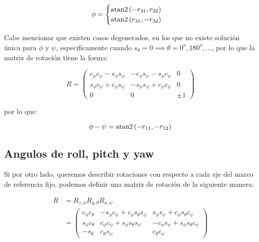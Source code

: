 \begin{multicols*}{3}
            \begin{equation}
                \phi =
                \begin{cases}
                    \operatorname{atan2}{(-r_{31}, r_{32})} \\
                    \operatorname{atan2}{(r_{31}, -r_{32})}
                \end{cases}
            \end{equation}

            Cabe mencionar que existen casos degenerados, en los que no existe solución única para $\phi$ y $\psi$, especificamente cuando $s_{\theta} = 0 \implies \theta = 0^o, 180^o, \dots$, por lo que la matriz de rotación tiene la forma:

            \begin{equation*}
                R =
                \begin{pmatrix}
                    c_{\phi} c_{\psi} - s_{\phi} s_{\psi} & - c_{\phi} s_{\psi} - s_{\phi} c_{\psi} & 0 \\
                    s_{\phi} c_{\psi} + c_{\phi} s_{\psi} & - s_{\phi} s_{\psi} + c_{\phi} c_{\psi} & 0 \\
                    0 & 0 & \pm 1
                \end{pmatrix}
            \end{equation*}

            por lo que:

            \begin{equation}
                \phi - \psi = \operatorname{atan2}{(-r_{11}, -r_{12})}
            \end{equation}


        \subsection{Angulos de roll, pitch y yaw}

            Si por otro lado, queremos describir rotaciones con respecto a cada eje del marco de referencia fijo, podemos definir una matriz de rotación de la siguiente manera:

            \begin{align}
                R &= R_{z, \phi} R_{y, \theta} R_{x, \psi} \nonumber \\
                &=
                \begin{pmatrix}
                    c_{\phi} c_{\theta} & -s_{\phi} c_{\psi} + c_{\phi} s_{\theta} s_{\psi} & s_{\phi} s_{\psi} + c_{\phi} s_{\theta} c_{\psi} \\
                    s_{\phi} c_{\theta} & c_{\phi} c_{\psi} + s_{\phi} s_{\theta} s_{\psi} & -c_{\phi} s_{\psi} + s_{\phi} s_{\theta} c_{\psi} \\
                    - s_{\theta} & c_{\theta} s_{\psi} & c_{\theta} c_{\psi}
                \end{pmatrix}
            \end{align}


\end{multicols*}
